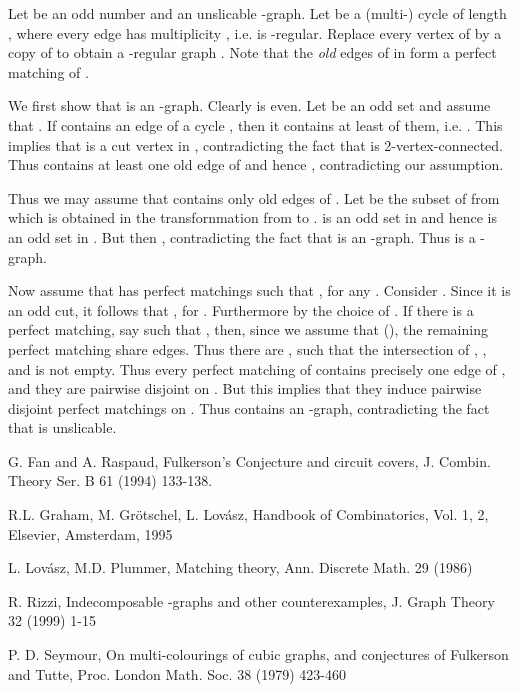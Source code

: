 \documentclass[fleqn,12pt]{article}
\newenvironment{proof}[1][Proof.]{\begin{trivlist}
\item[\hskip \labelsep {\bfseries #1}]}{\end{trivlist}}
\begin{document}
\begin{proof} Let   be an odd number and  an unslicable -graph. Let  be a (multi-) cycle of length , where every edge has multiplicity , 
i.e.  is -regular. Replace every vertex  of  by a copy  of  to obtain a -regular graph . Note that the {\em old} edges of  in  form a 
perfect matching  of . 

We first show that  is an -graph. Clearly  is even. Let  be an odd set and assume that . If  contains an edge of 
a cycle , then it contains at least  of them, i.e. . This implies that  is a cut vertex in , contradicting the fact that  is 2-vertex-connected. Thus 
 contains at least one old edge of  and hence , contradicting our assumption. 

Thus we may assume that  contains only old edges of . Let  be the subset of  from which  is obtained in the transfornmation from  to . 
 is an odd set in  and hence 
 is an odd set in . But then , contradicting the fact that  is an -graph. Thus  is a -graph. 

Now assume that  has  perfect matchings  such that , for any . 
Consider . Since it is an odd cut, it follows
that  , for . Furthermore  by the choice of . If there is a perfect matching, say  such that 
, then, since we assume that  (), the remaining  perfect matching  share  edges.
Thus there are , such that the intersection of , , and  is not empty. 
Thus every perfect matching of  contains precisely one edge of , and they are pairwise disjoint on . 
But this implies that they induce  pairwise disjoint perfect matchings  on . Thus  contains an -graph, contradicting the fact that
 is unslicable. 
\end{proof}


\begin{thebibliography}{99}

 G. Fan and A. Raspaud, Fulkerson's Conjecture and circuit covers, J. Combin. Theory Ser. B 61 (1994) 133-138.

 R.L. Graham, M. Gr\"otschel, L. Lov\'asz, Handbook of Combinatorics, Vol. 1, 2, Elsevier, Amsterdam, 1995

 L. Lov\'asz, M.D. Plummer, Matching theory, Ann. Discrete Math. 29 (1986)

 R. Rizzi, Indecomposable -graphs and other counterexamples, J. Graph Theory 32 (1999) 1-15

 P. D. Seymour, On multi-colourings of cubic graphs, and conjectures of Fulkerson and Tutte, Proc. London Math. Soc. 38 (1979) 423-460



\end{thebibliography}
\end{document}
